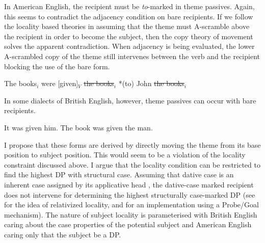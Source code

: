 {In American English, the recipient must be \textit{to}-marked in theme passives. Again, this seems to contradict the adjacency condition on bare recipients. If we follow the locality based theories in assuming that the theme must A-scramble above the recipient in order to become the subject, then the copy theory of movement solves the apparent contradiction. When adjacency is being evaluated, the lower A-scrambled copy of the theme still intervenes between the verb and the recipient blocking the use of the bare form.
\begin{exe}
\ex The books$_{i}$ were [given]$_{V}$ \sout{the books}$_{i}$ *(to) John \sout{the books}$_{i}$
\end{exe}%
In some dialects of British English, however, theme passives can occur with bare recipients. 
\begin{exe}
\ex 
\begin{xlist}
\ex It was given him.
\ex The book was given the man.
\end{xlist}
\end{exe}%
I propose that these forms are derived by directly moving the theme from its base position to subject position. This would seem to be a violation of the locality constraint discussed above. I argue that the locality condition can be restricted to find the highest DP with structural case. Assuming that dative case is an inherent case assigned by its applicative head \citep{Woolford.2006}, the dative-case marked recipient does not intervene for determining the highest structurally case-marked DP (see \cite{Rizzi.1990} for the idea of relativized locality, and \cite{Chomsky.2001} for an implementation using a Probe/Goal mechanism). The nature of subject locality is parameterised with British English caring about the case properties of the potential subject and American English caring only that the subject be a DP. \begin{exe}
\ex \hfill \break
{}
\end{exe}}

